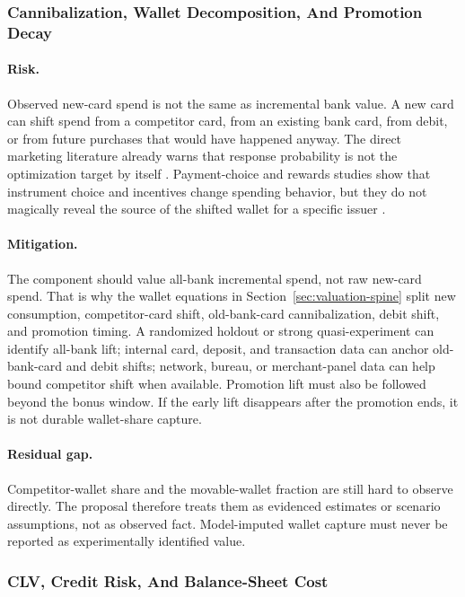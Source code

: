 \documentclass[11pt]{article}
\newcommand{\1}{\mathbf{1}}
\begin{document}
\subsubsection{Cannibalization, Wallet Decomposition, And Promotion Decay}

\paragraph{Risk.}
Observed new-card spend is not the same as incremental bank value. A new card
can shift spend from a competitor card, from an existing bank card, from
debit, or from future purchases that would have happened anyway. The direct
marketing literature already warns that response probability is not the
optimization target by itself \citep{bult1995directmail}. Payment-choice and
rewards studies show that instrument choice and incentives change spending
behavior, but they do not magically reveal the source of the shifted wallet
for a specific issuer \citep{koulayev2012payment,agarwal2010rewards,
prelec2001creditcard,gross2001liquidity}.

\paragraph{Mitigation.}
The component should value all-bank incremental spend, not raw new-card spend.
That is why the wallet equations in Section~\ref{sec:valuation-spine} split
new consumption, competitor-card shift, old-bank-card cannibalization, debit
shift, and promotion timing. A randomized holdout or strong quasi-experiment
can identify all-bank lift; internal card, deposit, and transaction data can
anchor old-bank-card and debit shifts; network, bureau, or merchant-panel data
can help bound competitor shift when available. Promotion lift must also be
followed beyond the bonus window. If the early lift disappears after the
promotion ends, it is not durable wallet-share capture.

\paragraph{Residual gap.}
Competitor-wallet share and the movable-wallet fraction are still hard to
observe directly. The proposal therefore treats them as evidenced estimates or
scenario assumptions, not as observed fact. Model-imputed wallet capture must
never be reported as experimentally identified value.

\subsubsection{CLV, Credit Risk, And Balance-Sheet Cost}
\end{document}
